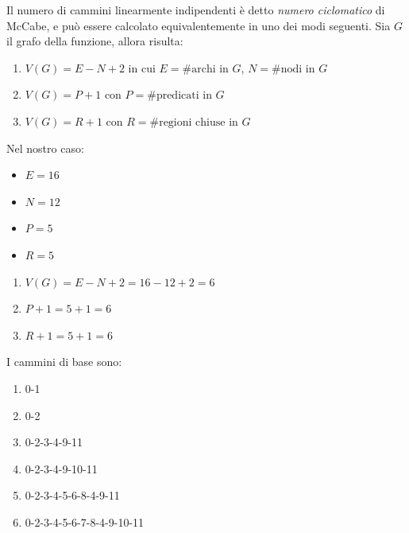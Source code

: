 \noindent\begin{minipage}[t]{0.58\linewidth}
	\vspace{0pt}
	Il numero di cammini linearmente indipendenti è detto \emph{numero ciclomatico} di McCabe, e può essere calcolato equivalentemente in uno dei modi seguenti. Sia $G$ il grafo della funzione, allora risulta:
	\begin{enumerate}
		\item $V(G) = E - N + 2$ in cui $E = \text{\#archi in } G$, $N = \text{\#nodi in } G$
		\item $V(G) = P + 1$ con $P = \text{\#predicati in } G$
		\item $V(G) = R + 1$ con $R = \text{\#regioni chiuse in } G$
	\end{enumerate}%
	Nel nostro caso:%
	\begin{itemize}
		\item $E = 16$
		\item $N = 12$
		\item $P = 5$
		\item $R = 5$
	\end{itemize}%
	\begin{enumerate}
		\item $V(G) = E - N + 2 = 16 - 12 + 2 = 6$
		\item $P + 1 = 5 + 1 = 6$
		\item $R + 1 = 5 + 1 = 6$
	\end{enumerate}%
	\noindent I cammini di base sono:
	\begin{enumerate}
		\item 0-1
		\item 0-2
		\item 0-2-3-4-9-11
		\item 0-2-3-4-9-10-11
		\item 0-2-3-4-5-6-8-4-9-11
		\item 0-2-3-4-5-6-7-8-4-9-10-11
	\end{enumerate}
\end{minipage}
\hfill
